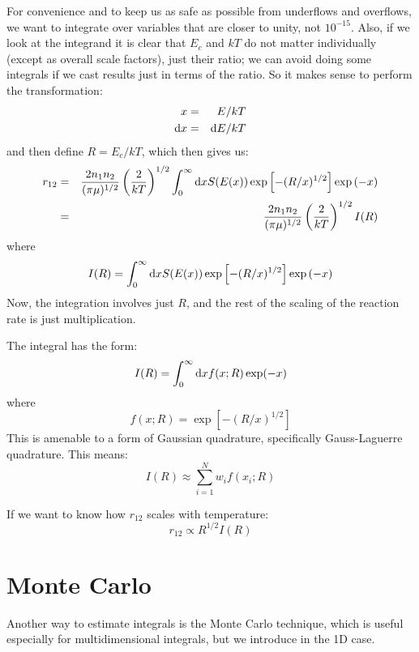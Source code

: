 For convenience and to keep us as safe as possible from underflows and
overflows, we want to integrate over variables that are closer to
unity, not $10^{-15}$. Also, if we look at the integrand it is clear
that $E_c$ and $kT$ do not matter individually (except as overall
scale factors), just their ratio; we can avoid doing some integrals if
we cast results just in terms of the ratio.  So it makes sense to
perform the transformation:
\begin{eqnarray}
 x &=& E / kT \cr
 {\rm d}x &=& {\rm d}E / kT
\end{eqnarray}
and then define $R = E_c /kT$,
which then gives us:
\begin{eqnarray}
r_{12} &=& \frac{2 n_1 n_2}{(\pi \mu)^{1/2}}
\left(\frac{2}{kT}\right)^{1/2}
\int_0^\infty {\rm d}x S(E(x))
\exp\left[-(R/x)^{1/2}\right] \exp\left(- x \right) \cr
&=& \frac{2 n_1 n_2}{(\pi \mu)^{1/2}}
\left(\frac{2}{kT}\right)^{1/2} I(R)
\end{eqnarray}
where
\begin{equation}
I(R) = \int_0^\infty {\rm d}x S(E(x))
\exp\left[-(R/x)^{1/2}\right] \exp\left(- x \right) 
\end{equation}
Now, the integration involves just $R$, and the rest of the scaling of
the reaction rate is just multiplication.

The integral has the form:
\begin{equation}
I(R) = \int_0^{\infty} {\rm d}x f(x; R) \exp(-x)
\end{equation}
where
\begin{equation}
f(x; R) = 
\exp\left[-(R/x)^{1/2}\right]
\end{equation}
This is amenable to a form of Gaussian quadrature, specifically
Gauss-Laguerre quadrature. This means:
\begin{equation}
I(R) \approx \sum_{i=1}^N w_i f(x_i; R)
\end{equation}

If we want to know how $r_{12}$ scales with temperature:
\begin{equation}
r_{12} \propto R^{1/2} I(R)
\end{equation}

\section{Monte Carlo}


Another way to estimate integrals is the Monte Carlo technique, which
is useful especially for multidimensional integrals, but we introduce
in the 1D case.

